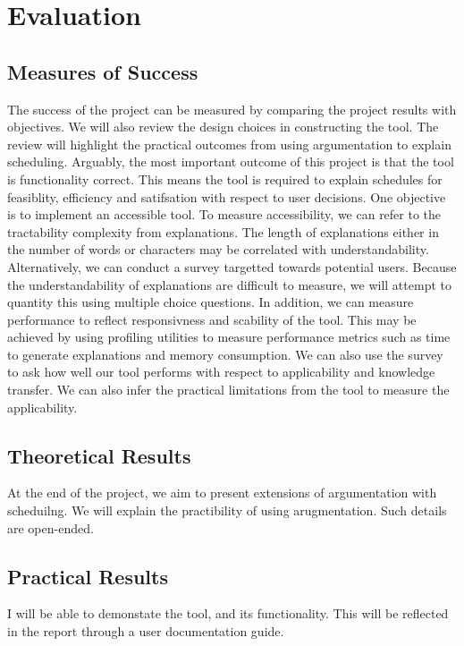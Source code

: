 \chapter{Evaluation}

\section{Measures of Success}

The success of the project can be measured by comparing the project results with objectives. We will also review the design choices in constructing the tool. The review will highlight the practical outcomes from using argumentation to explain scheduling.
\linespace
Arguably, the most important outcome of this project is that the tool is functionality correct. This means the tool is required to explain schedules for feasiblity, efficiency and satifsation with respect to user decisions.
\linespace
One objective is to implement an accessible tool. To measure accessibility, we can refer to the tractability complexity from explanations. The length of explanations either in the number of words or characters may be correlated with understandability. Alternatively, we can conduct a survey targetted towards potential users. Because the understandability of explanations are difficult to measure, we will attempt to quantity this using multiple choice questions. In addition, we can measure performance to reflect responsivness and scability of the tool. This may be achieved by using profiling utilities to measure performance metrics such as time to generate explanations and memory consumption.
\linespace
We can also use the survey to ask how well our tool performs with respect to applicability and knowledge transfer. We can also infer the practical limitations from the tool to measure the applicability.

\section{Theoretical Results}

At the end of the project, we aim to present extensions of argumentation with scheduilng. We will explain the practibility of using arugmentation. Such details are open-ended.

\section{Practical Results} 

I will be able to demonstate the tool, and its functionality. This will be reflected in the report through a user documentation guide.